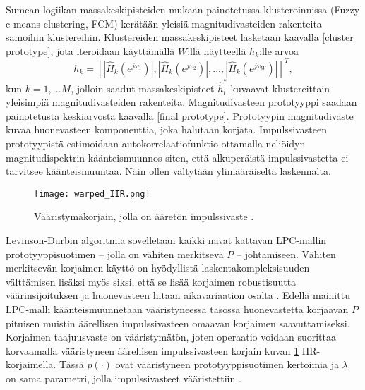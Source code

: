 \documentclass[finnish,12pt]{article}
\begin{document}
Sumean logiikan massakeskipisteiden mukaan painotetussa klusteroinnissa (Fuzzy c-means clustering, FCM) kerätään yleisiä magnitudivasteiden rakenteita samoihin klustereihin. Klustereiden massakeskipisteet lasketaan kaavalla \eqref{cluster prototype}, jota iteroidaan käyttämällä $W$:llä näytteellä $h_k$:lle arvoa \begin{equation}
h_k = \left[ |\hat{H}_k(e^{j \omega_1})|,|\hat{H}_k(e^{j \omega_2})|, ..., |\hat{H}_k(e^{j \omega_W})| \right]^T,
\end{equation} kun $k = 1, ... M$, jolloin saadut massakeskipisteet $\hat{h}_i^*$ kuvaavat klustereittain yleisimpiä magnitudivasteiden rakenteita. Magnitudivasteen prototyyppi saadaan painotetusta keskiarvosta kaavalla \eqref{final prototype}. Prototyypin magnitudivaste kuvaa huonevasteen komponenttia, joka halutaan korjata. Impulssivasteen prototyypistä estimoidaan autokorrelaatiofunktio ottamalla neliöidyn magnitudispektrin käänteismuunnos siten, että alkuperäistä impulssivastetta ei tarvitsee käänteismuuntaa. Näin ollen vältytään ylimääräiseltä laskennalta. \begin{figure}[h!]
	\centering
	\texttt{[image: warped\_IIR.png]}
	\caption{Vääristymäkorjain, jolla on ääretön impulssivaste \cite{ACarini2012}.}
	\label{fig:infinite impulse response}
\end{figure}

Levinson-Durbin algoritmia sovelletaan kaikki navat kattavan LPC-mallin prototyyppisuotimen -- jolla on vähiten merkitsevä $P$ -- johtamiseen. Vähiten merkitsevän korjaimen käyttö on hyödyllistä laskentakompleksisuuden välttämisen lisäksi myös siksi, että se lisää korjaimen robustisuutta väärinsijoituksen ja huonevasteen hitaan aikavariaation osalta \cite{P.D.Hatziantoniou2004}. Edellä mainittu LPC-malli käänteismuunnetaan vääristyneessä tasossa huonevastetta korjaavan $P$ pituisen muistin äärellisen impulssivasteen omaavan korjaimen saavuttamiseksi. Korjaimen taajuusvaste on vääristymätön, joten operaatio voidaan suorittaa korvaamalla vääristyneen äärellisen impulssivasteen korjain kuvan \ref{fig:infinite impulse response} IIR-korjaimella. Tässä $p(\cdot)$ ovat vääristyneen prototyyppisuotimen kertoimia ja $\lambda$ on sama parametri, jolla impulssivasteet vääristettiin \cite{Karjalainen1997}.
\end{document}
